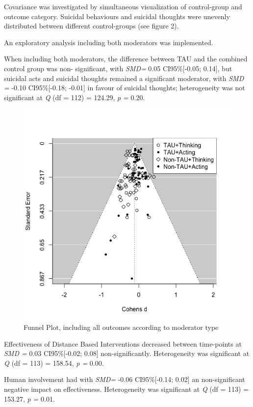 \documentclass[
  english,
  man]{apa6}
\begin{document}
Covariance was investigated by simultaneous visualization of control-group and outcome category. Suicidal behaviours and suicidal thoughts were unevenly distributed between different control-groups (see figure 2).

An exploratory analysis including both moderators was implemented.

When including both moderators, the difference between TAU and the combined control group was non- significant, with \emph{SMD=} 0.05 CI95\%{[}-0.05; 0.14{]}, but suicidal acts and suicidal thoughts remained a significant moderator, with \emph{SMD =} -0.10 CI95\%{[}-0.18; -0.01{]} in favour of suicidal thoughts; heterogeneity was not significant at \emph{Q} (df = 112) = 124.29, \emph{p =} 0.20.

\begin{figure}
\centering
\includegraphics{01_Plots/Rplot2.png}
\caption{Funnel Plot, including all outcomes according to moderator type}
\end{figure}

Effectiveness of Distance Based Interventions decreased between time-points at \emph{SMD =} 0.03 CI95\%{[}-0.02; 0.08{]} non-significantly. Heterogeneity was significant at \emph{Q} (df = 113) = 158.54, \emph{p =} 0.00.

Human involvement had with \emph{SMD=} -0.06 CI95\%{[}-0.14; 0.02{]} an non-significant negative impact on effectiveness. Heterogeneity was significant at \emph{Q} (df = 113) = 153.27, \emph{p =} 0.01.
\end{document}
